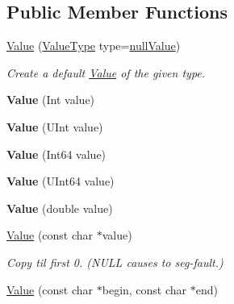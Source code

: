 \subsection*{Public Member Functions}
\begin{DoxyCompactItemize}
\item 
\hyperlink{classJson_1_1Value_ada6ba1369448fb0240bccc36efaa46f7}{Value} (\hyperlink{namespaceJson_a7d654b75c16a57007925868e38212b4e}{Value\+Type} type=\hyperlink{namespaceJson_a7d654b75c16a57007925868e38212b4ea7d9899633b4409bd3fc107e6737f8391}{null\+Value})
\begin{DoxyCompactList}\small\item\em Create a default \hyperlink{classJson_1_1Value}{Value} of the given type. \end{DoxyCompactList}\item 
\mbox{\label{classJson_1_1Value_a4744ae571fcf34f4b16a2257b3b3b585}} 
{\bfseries Value} (Int value)
\item 
\mbox{\label{classJson_1_1Value_ae67a857b01286e3499a87e95be848d20}} 
{\bfseries Value} (U\+Int value)
\item 
\mbox{\label{classJson_1_1Value_ab1cdc3d9a4d4cc03fa01439d43ceb1b5}} 
{\bfseries Value} (Int64 value)
\item 
\mbox{\label{classJson_1_1Value_a8adda58d5ae17bf7ca6a53bab4a7b69c}} 
{\bfseries Value} (U\+Int64 value)
\item 
\mbox{\label{classJson_1_1Value_a32228cc84d83200cca8441451997996c}} 
{\bfseries Value} (double value)
\item 
\mbox{\label{classJson_1_1Value_ad87b849356816aca75995dd07302e49d}} 
\hyperlink{classJson_1_1Value_ad87b849356816aca75995dd07302e49d}{Value} (const char $\ast$value)
\begin{DoxyCompactList}\small\item\em Copy til first 0. (N\+U\+LL causes to seg-\/fault.) \end{DoxyCompactList}\item 
\mbox{\label{classJson_1_1Value_a39fa09d1902efbd4350e1236db920571}} 
\hyperlink{classJson_1_1Value_a39fa09d1902efbd4350e1236db920571}{Value} (const char $\ast$begin, const char $\ast$end)

\end{DoxyCompactItemize}
